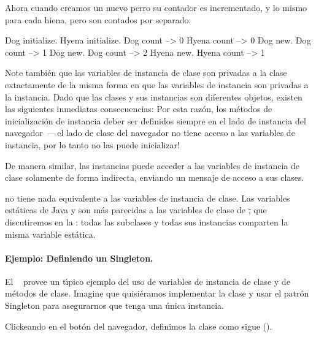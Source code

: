 \documentclass[a4paper,10pt,twoside]{book}
\begin{document}
Ahora cuando creamos un nuevo perro su contador es incrementado, y lo mismo para cada hiena, pero son contados por separado:

\begin{code}{}
Dog initialize.
Hyena initialize.
Dog count     --> 0
Hyena count --> 0
Dog new.
Dog count     --> 1
Dog new.
Dog count     --> 2
Hyena new.
Hyena count --> 1
\end{code}

Note tambi\'en que las variables de instancia de clase son privadas a la clase extactamente de la misma forma en que las variables de instancia son privadas a la instancia. 
Dado que las clases y sus instancias son diferentes objetos, existen las siguientes inmediatas consecuencias:
Por esta raz\'on, los m\'etodos de inicializaci\'on de instancia deber ser definidos siempre en el lado de instancia del navegador
\,---\,el lado de clase del navegador no tiene acceso a las variables de instancia, por lo tanto no las puede inicializar! 

De manera similar, las instancias puede acceder a las variables de instancia de clase solamente de forma indirecta, enviando un mensaje de acceso a sus clases. 

 no tiene nada equivalente a las variables de instancia de clase. 
Las variables est\'aticas de Java y  son m\'as parecidas a las variables de clase de \st, que discutiremos en la : todas las subclases y todas sus instancias comparten la misma variable est\'atica.


\paragraph{Ejemplo: Definiendo un Singleton.}
El ~\cite{Alpe98a} provee un t\'\i{}pico ejemplo del uso de variables de instancia de clase y de m\'etodos de clase.
Imagine que quisi\'eramos implementar la clase  y usar el patr\'on Singleton para asegurarnos que tenga una \'unica instancia. 

Clickeando en el bot\'on  del navegador, definimos la clase  como sigue (). 
\end{document}
